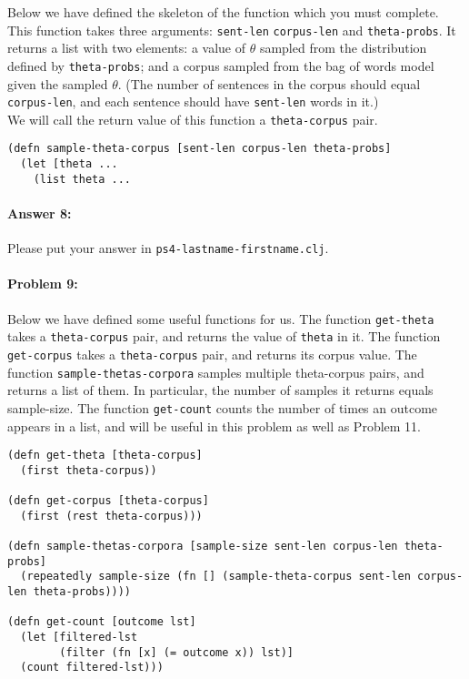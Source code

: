 \documentclass[10pt]{article}
\newcommand{\required}[1]{{\color{blue}{#1}}}
\newcommand{\PSnum}{4}
\begin{document}
Below we have defined the skeleton of the function
\required{\texttt{sample-theta-corpus}} which you must complete.  This
function takes three arguments: \texttt{sent-len} \texttt{corpus-len}
and \texttt{theta-probs}. It returns a list with two elements: a value
of $\theta$ sampled from the distribution defined by
\texttt{theta-probs}; and a corpus sampled from the bag of words model
given the sampled $\theta$. (The number of sentences in the corpus
should equal \texttt{corpus-len}, and each sentence should have
\texttt{sent-len} words in it.) \\

 We will call the return value of this function a \texttt{theta-corpus} pair.

\begin{lstlisting}
(defn sample-theta-corpus [sent-len corpus-len theta-probs]
  (let [theta ...
    (list theta ...
\end{lstlisting}

\paragraph{Answer 8:} Please put your answer in
\texttt{ps\PSnum-lastname-firstname.clj}.

\hrulefill %

\paragraph{Problem 9:}

Below we have defined some useful functions for us. The function
\texttt{get-theta} takes a \texttt{theta-corpus} pair, and returns the
value of \texttt{theta} in it. The function \texttt{get-corpus} takes
a \texttt{theta-corpus} pair, and returns its corpus value. The
function \texttt{sample-thetas-corpora} samples multiple theta-corpus
pairs, and returns a list of them. In particular, the number of
samples it returns equals sample-size.  The function \texttt{get-count}
counts the number of times an outcome appears in a list, and will be
useful in this problem as well as Problem 11.

\begin{lstlisting}
(defn get-theta [theta-corpus]
  (first theta-corpus))

(defn get-corpus [theta-corpus]
  (first (rest theta-corpus)))
  
(defn sample-thetas-corpora [sample-size sent-len corpus-len theta-probs]
  (repeatedly sample-size (fn [] (sample-theta-corpus sent-len corpus-len theta-probs))))

(defn get-count [outcome lst]
  (let [filtered-lst 
        (filter (fn [x] (= outcome x)) lst)]
  (count filtered-lst)))
\end{lstlisting}
\end{document}
